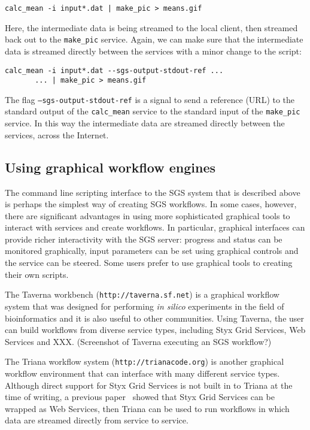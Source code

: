 \documentclass{llncs}
\begin{document}
\begin{verbatim}
calc_mean -i input*.dat | make_pic > means.gif
\end{verbatim}

Here, the intermediate data is being streamed to the local client, then streamed back out to the {\tt make\_pic} service.  Again, we can make sure that the intermediate data is streamed directly between the services with a minor change to the script:

\begin{verbatim}
calc_mean -i input*.dat --sgs-output-stdout-ref ...
       ... | make_pic > means.gif
\end{verbatim}

The flag {\tt --sgs-output-stdout-ref} is a signal to send a reference (URL) to the standard output of the {\tt calc\_mean} service to the standard input of the {\tt make\_pic} service.  In this way the intermediate data are streamed directly between the services, across the Internet.
%
\subsection{Using graphical workflow engines}
The command line scripting interface to the SGS system that is described above is perhaps the simplest way of creating SGS workflows.  In some cases, however, there are significant advantages in using more sophisticated graphical tools to interact with services and create workflows.  In particular, graphical interfaces can provide richer interactivity with the SGS server: progress and status can be monitored graphically, input parameters can be set using graphical controls and the service can be steered.  Some users prefer to use graphical tools to creating their own scripts.

The Taverna workbench ({\tt http://taverna.sf.net}) is a graphical workflow system that was designed for performing {\it in silico} experiments in the field of bioinformatics and it is also useful to other communities.  Using Taverna, the user can build workflows from diverse service types, including Styx Grid Services, Web Services and XXX.  (Screenshot of Taverna executing an SGS workflow?)

The Triana workflow system ({\tt http://trianacode.org}) is another graphical workflow environment that can interface with many different service types.  Although direct support for Styx Grid Services is not built in to Triana at the time of writing, a previous paper~\cite{blower:2005} showed that Styx Grid Services can be wrapped as Web Services, then Triana can be used to run workflows in which data are streamed directly from service to service.
%
\end{document}
